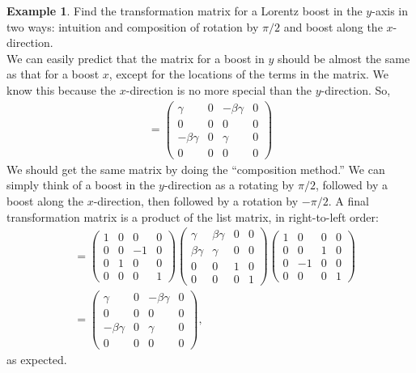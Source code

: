 \documentclass{book}
\theoremstyle{definition}
\newtheorem{exmp}{Example}[section]
\begin{document}
\begin{exmp}
	 Find the transformation matrix for a Lorentz boost in the $y$-axis in two ways: intuition and composition of rotation by $\pi/2$ and boost along the $x$-direction.\\
	 
	 We can easily predict that the matrix for a boost in $y$ should be almost the same as that for a boost $x$, except for the locations of the terms in the matrix. We know this because the $x$-direction is no more special than the $y$-direction. So,
	 \begin{align*}
	 [\Lambda^{\mu'}_\nu] = 
	 \begin{pmatrix}
	 \gamma&0&-\beta\gamma&0\\
	 0&0&0&0\\
	 -\beta\gamma&0&\gamma&0\\
	 0&0&0&0
	 \end{pmatrix}
	 \end{align*}
	 We should get the same matrix by doing the ``composition method.'' We can simply think of a boost in the $y$-direction as a rotating by $\pi/2$, followed by a boost along the $x$-direction, then followed by a rotation by $-\pi/2$. A final transformation matrix is a product of the list matrix, in right-to-left order:
	 \begin{align*}
	 [\Lambda^{\mu'}_\nu] &= 
	 \begin{pmatrix}
	 1 & 0 & 0 & 0 \\
	 0 & 0 & -1 & 0\\
	 0 & 1 & 0 & 0\\
	 0 & 0 & 0 & 1
	 \end{pmatrix}
	 \begin{pmatrix}
	 \gamma & \beta\gamma & 0 & 0\\
	 \beta\gamma & \gamma & 0 & 0\\
	 0 & 0 & 1 & 0\\
	 0 & 0 & 0 & 1
	 \end{pmatrix}
	\begin{pmatrix}
	1 & 0 & 0 & 0\\
	0 & 0 & 1 & 0\\
	0 & -1 & 0 & 0\\
	0 & 0 & 0 & 1
	\end{pmatrix}\\
	&=
	\begin{pmatrix}
	\gamma&0&-\beta\gamma&0\\
	0&0&0&0\\
	-\beta\gamma&0&\gamma&0\\
	0&0&0&0
	\end{pmatrix},
	 \end{align*}
	 as expected.
\end{exmp}
\end{document}

